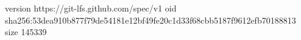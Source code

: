 version https://git-lfs.github.com/spec/v1
oid sha256:53dea910b877f79de54181e12bf49fe20c1d33f68cbb5187f9612efb70188813
size 145339
